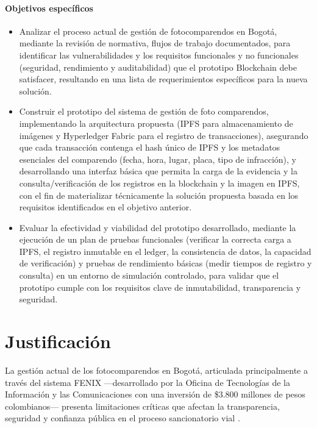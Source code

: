 \documentclass[
    letterpaper, 
    man,   
    spanish,
    12pt,
    donotrepeattitle,
    floatsintext,
    hidelinks %
]{apa7}
\renewcommand{\large}{\fontsize{14.4}{18}\selectfont}
\begin{document}
\paragraph{Objetivos específicos}
\begin{itemize}
    \item Analizar el proceso actual de gestión de fotocomparendos en Bogotá, mediante la revisión de normativa, flujos de trabajo documentados, para identificar las vulnerabilidades y los requisitos funcionales y no funcionales (seguridad, rendimiento y auditabilidad) que el prototipo Blockchain debe satisfacer, resultando en una lista de requerimientos específicos para la nueva solución.
    \item Construir el prototipo del sistema de gestión de foto comparendos, implementando la arquitectura propuesta (IPFS para almacenamiento de imágenes y Hyperledger Fabric para el registro de transacciones), asegurando que cada transacción contenga el hash único de IPFS y los metadatos esenciales del comparendo (fecha, hora, lugar, placa, tipo de infracción), y desarrollando una interfaz básica que permita la carga de la evidencia y la consulta/verificación de los registros en la blockchain y la imagen en IPFS, con el fin de materializar técnicamente la solución propuesta basada en los requisitos identificados en el objetivo anterior.
    \item Evaluar la efectividad y viabilidad del prototipo desarrollado, mediante la ejecución de un plan de pruebas funcionales (verificar la correcta carga a IPFS, el registro inmutable en el ledger, la consistencia de datos, la capacidad de verificación) y pruebas de rendimiento básicas (medir tiempos de registro y consulta) en un entorno de simulación controlado, para validar que el prototipo cumple con los requisitos clave de inmutabilidad, transparencia y seguridad.
\end{itemize}

\newpage
\section{\large Justificación}

La gestión actual de los fotocomparendos en Bogotá, articulada principalmente a través del sistema FENIX —desarrollado por la Oficina de Tecnologías de la Información y las Comunicaciones con una inversión de \$3.800 millones de pesos colombianos— presenta limitaciones críticas que afectan la transparencia, seguridad y confianza pública en el proceso sancionatorio vial \parencite{resolucionFenix}.
\end{document}
